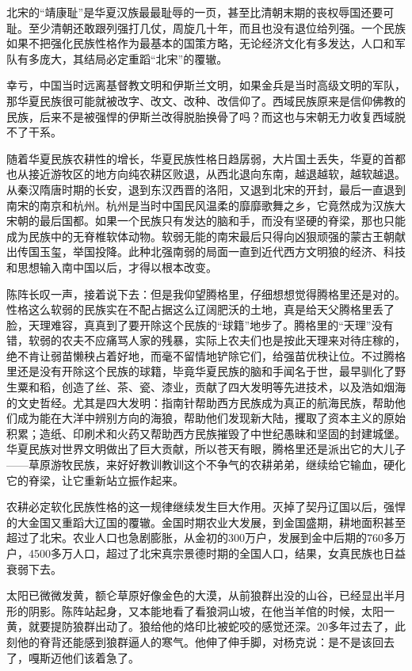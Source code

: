 \par 北宋的“靖康耻”是华夏汉族最最耻辱的一页，甚至比清朝末期的丧权辱国还要可耻。至少清朝还敢跟列强打几仗，周旋几十年，而且也没有退位给列强。一个民族如果不把强化民族性格作为最基本的国策方略，无论经济文化有多发达，人口和军队有多庞大，其结局必定重蹈“北宋”的覆辙。
\par 幸亏，中国当时远离基督教文明和伊斯兰文明，如果金兵是当时高级文明的军队，那华夏民族很可能就被改字、改文、改种、改信仰了。西域民族原来是信仰佛教的民族，后来不是被强悍的伊斯兰改得脱胎换骨了吗？而这也与宋朝无力收复西域脱不了干系。
\par 随着华夏民族农耕性的增长，华夏民族性格日趋孱弱，大片国土丢失，华夏的首都也从接近游牧区的地方向纯农耕区败退，从西北退向东南，越退越软，越软越退。从秦汉隋唐时期的长安，退到东汉西晋的洛阳，又退到北宋的开封，最后一直退到南宋的南京和杭州。杭州是当时中国民风温柔的靡靡歌舞之乡，它竟然成为汉族大宋朝的最后国都。如果一个民族只有发达的脑和手，而没有坚硬的脊梁，那也只能成为民族中的无脊椎软体动物。软弱无能的南宋最后只得向凶狠顽强的蒙古王朝献出传国玉玺，举国投降。此种北强南弱的局面一直到近代西方文明狼的经济、科技和思想输入南中国以后，才得以根本改变。
\par 陈阵长叹一声，接着说下去：但是我仰望腾格里，仔细想想觉得腾格里还是对的。性格这么软弱的民族实在不配占据这么辽阔肥沃的土地，真是给天父腾格里丢了脸，天理难容，真真到了要开除这个民族的“球籍”地步了。腾格里的“天理”没有错，软弱的农夫不应痛骂人家的残暴，实际上农夫们也是按此天理来对待庄稼的，绝不肯让弱苗懒秧占着好地，而毫不留情地铲除它们，给强苗优秧让位。不过腾格里还是没有开除这个民族的球籍，毕竟华夏民族的脑和手闻名于世，最早驯化了野生粟和稻，创造了丝、茶、瓷、漆业，贡献了四大发明等先进技术，以及浩如烟海的文史哲经。尤其是四大发明：指南针帮助西方民族成为真正的航海民族，帮助他们成为能在大洋中辨别方向的海狼，帮助他们发现新大陆，攫取了资本主义的原始积累；造纸、印刷术和火药又帮助西方民族摧毁了中世纪愚昧和坚固的封建城堡。华夏民族对世界文明做出了巨大贡献，所以苍天有眼，腾格里还是派出它的大儿子——草原游牧民族，来好好教训教训这个不争气的农耕弟弟，继续给它输血，硬化它的脊梁，让它重新站立振作起来。
\par 农耕必定软化民族性格的这一规律继续发生巨大作用。灭掉了契丹辽国以后，强悍的大金国又重蹈大辽国的覆辙。金国时期农业大发展，到金国盛期，耕地面积甚至超过了北宋。农业人口也急剧膨胀，从金初的300万户，发展到金中后期的760多万户，4500多万人口，超过了北宋真宗景德时期的全国人口，结果，女真民族也日益衰弱下去。
\par 
\par 太阳已微微发黄，额仑草原好像金色的大漠，从前狼群出没的山谷，已经显出半月形的阴影。陈阵站起身，又本能地看了看狼洞山坡，在他当羊倌的时候，太阳一黄，就要提防狼群出动了。狼给他的烙印比被蛇咬的感觉还深。20多年过去了，此刻他的脊背还能感到狼群逼人的寒气。他伸了伸手脚，对杨克说：是不是该回去了，嘎斯迈他们该着急了。
